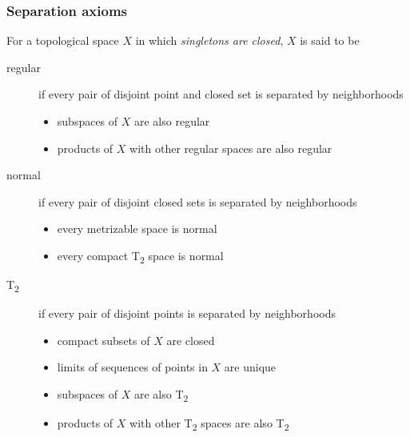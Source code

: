 \documentclass[tbtags,columns=2]{cheatsheet}
\begin{document}
\subsubsection{Separation axioms}
    For a topological space $X$ in which \emph{singletons are closed}, $X$ is said to be
\begin{description}
    \item[regular] if every pair of disjoint point and closed set is separated by neighborhoods\begin{itemize}[label=$\implies$]
        \item subspaces of $X$ are also regular
        \item products of $X$ with other regular spaces are also regular
    \end{itemize}
    \item[normal] if every pair of disjoint closed sets is separated by neighborhoods\begin{itemize}[label=$\implies$]
        \item every metrizable space is normal
        \item every compact T\textsubscript{2} space is normal
    \end{itemize}
    \item[T\textsubscript{2}] if every pair of disjoint points is separated by neighborhoods \begin{itemize}[label=$\implies$]
        \item compact subsets of $X$ are closed
        \item limits of sequences of points in $X$ are unique
        \item subspaces of $X$ are also T\textsubscript{2}
        \item products of $X$ with other T\textsubscript{2} spaces are also T\textsubscript{2}
    \end{itemize}
\end{description}
\end{document}
